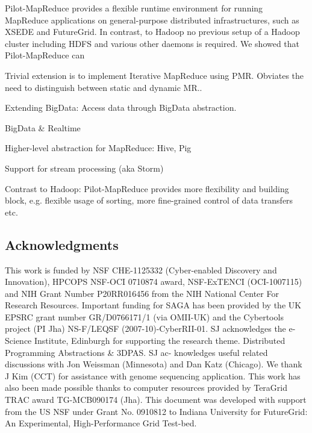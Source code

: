 \documentclass{acm_proc_article-sp}
\newcommand{\pilotmapreduce}{Pilot-MapReduce\xspace}
\begin{document}
\pilotmapreduce provides a flexible runtime environment for running MapReduce 
applications on general-purpose distributed infrastructures, such as XSEDE and 
FutureGrid. In contrast, to Hadoop no previous setup of a Hadoop cluster 
including HDFS and various other daemons is required. We showed that \pilotmapreduce can 

Trivial extension is to implement Iterative MapReduce using PMR.  
Obviates the need to distinguish between static and dynamic MR..


Extending BigData: Access data through BigData abstraction.


BigData \& Realtime

Higher-level abstraction for MapReduce: Hive, Pig

Support for stream processing (aka Storm)

Contrast to Hadoop:
Pilot-MapReduce provides more flexibility and building block, e.g. flexible 
usage of sorting, more fine-grained control of data transfers etc.

%

%
%
%


\subsection*{Acknowledgments}
\scriptsize This work is funded by NSF CHE-1125332 (Cyber-enabled
Discovery and Innovation), HPCOPS NSF-OCI 0710874 award, NSF-ExTENCI
(OCI-1007115) and NIH Grant Number P20RR016456 from the NIH National
Center For Research Resources. Important funding for SAGA has been
provided by the UK EPSRC grant number GR/D0766171/1 (via OMII-UK) and
the Cybertools project (PI Jha) NS-F/LEQSF (2007-10)-CyberRII-01. SJ
acknowledges the e-Science Institute, Edinburgh for supporting the
research theme. Distributed Programming Abstractions \& 3DPAS. SJ ac-
knowledges useful related discussions with Jon Weissman (Minnesota)
and Dan Katz (Chicago). We thank J Kim (CCT) for assistance with
genome sequencing application. This work has also been made possible
thanks to computer resources provided by TeraGrid TRAC award
TG-MCB090174 (Jha). This document was developed with support from the
US NSF under Grant No. 0910812 to Indiana University for FutureGrid:
An Experimental, High-Performance Grid Test-bed.
\end{document}
